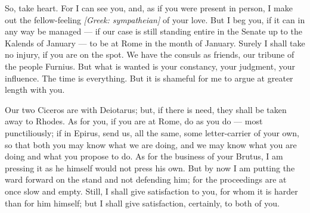  So, take heart. For I can see you, and, as if you were present in person, I make out the fellow-feeling \textit{[Greek: sympatheian]} of your love. But I beg you, if it can in any way be managed --- if our case is still standing entire in the Senate up to the Kalends of January --- to be at Rome in the month of January. Surely I shall take no injury, if you are on the spot. We have the consuls as friends, our tribune of the people Furnius. But what is wanted is your constancy, your judgment, your influence. The time is everything. But it is shameful for me to argue at greater length with you.

 Our two Ciceros are with Deiotarus; but, if there is need, they shall be taken away to Rhodes. As for you, if you are at Rome, do as you do --- most punctiliously; if in Epirus, send us, all the same, some letter-carrier of your own, so that both you may know what we are doing, and we may know what you are doing and what you propose to do. As for the business of your Brutus, I am pressing it as he himself would not press his own. But by now I am putting the ward forward on the stand and not defending him; for the proceedings are at once slow and empty. Still, I shall give satisfaction to you, for whom it is harder than for him himself; but I shall give satisfaction, certainly, to both of you.
